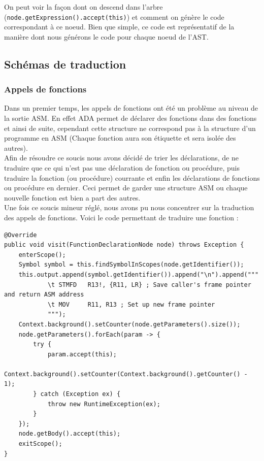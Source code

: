 \documentclass[french,a4paper]{article}
\begin{document}
    On peut voir la façon dont on descend dans l'arbre (\texttt{node.getExpression().accept(this)}) et comment on génère le code correspondant à ce noeud. Bien que simple, ce code est représentatif de la manière dont nous générons le code pour chaque noeud de l'AST.

    \subsection{Schémas de traduction}
    \subsubsection{Appels de fonctions}

    Dans un premier temps, les appels de fonctions ont été un problème au niveau de la sortie ASM. En effet ADA permet de déclarer des fonctions dans des fonctions et ainsi de suite, cependant cette structure ne correspond pas à la structure d'un programme en ASM (Chaque fonction aura son étiquette et sera isolée des autres). \\
    Afin de résoudre ce soucis nous avons décidé de trier les déclarations, de ne traduire que ce qui n'est pas une déclaration de fonction ou procédure, puis traduire la fonction (ou procédure) courrante et enfin les déclarations de fonctions ou procédure en dernier. Ceci permet de garder une structure ASM ou chaque nouvelle fonction est bien a part des autres. \\

    Une fois ce soucis mineur réglé, nous avons pu nous concentrer sur la traduction des appels de fonctions.
    Voici le code permettant de traduire une fonction :
    \begin{lstlisting}
@Override
public void visit(FunctionDeclarationNode node) throws Exception {
    enterScope();
    Symbol symbol = this.findSymbolInScopes(node.getIdentifier());
    this.output.append(symbol.getIdentifier()).append("\n").append("""
            \t STMFD   R13!, {R11, LR} ; Save caller's frame pointer and return ASM address
            \t MOV     R11, R13 ; Set up new frame pointer
            """);
    Context.background().setCounter(node.getParameters().size());
    node.getParameters().forEach(param -> {
        try {
            param.accept(this);
            Context.background().setCounter(Context.background().getCounter() - 1);
        } catch (Exception ex) {
            throw new RuntimeException(ex);
        }
    });
    node.getBody().accept(this);
    exitScope();
}
    \end{lstlisting}
\end{document}
